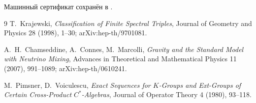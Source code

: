 Машинный сертификат сохранён в
.

\begin{thebibliography}{9}
T.~Krajewski,
\emph{Classification of Finite Spectral Triples},
Journal of Geometry and Physics 28 (1998), 1--30;
arXiv:hep-th/9701081.

A.~H.~Chamseddine, A.~Connes, M.~Marcolli,
\emph{Gravity and the Standard Model with Neutrino Mixing},
Advances in Theoretical and Mathematical Physics 11 (2007), 991--1089;
arXiv:hep-th/0610241.

M.~Pimsner, D.~Voiculescu,
\emph{Exact Sequences for $K$-Groups and Ext-Groups of Certain
Cross-Product $C^*$-Algebras},
Journal of Operator Theory 4 (1980), 93--118.
\end{thebibliography}